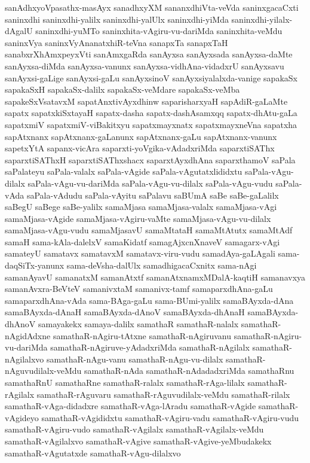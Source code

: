 {sanAdhxyoVpasathx-masAyx
sanadhxyXM
sananxdhiVta-veVda
saninxgacaCxti
saninxdhi
saninxdhi-yalilx
saninxdhi-yalUlx
saninxdhi-yiMda
saninxdhi-yilalx-dAgalU
saninxdhi-yuMTo
saninxhita-vAgiru-vu-dariMda
saninxhita-veMdu
saninxVya
saninxVyAnanatxhiR-teVna
sanapxTa
sanapxTaH
sanabxrXhAmxpeyxVti
sanAmxgaRda
sanAyxsa
sanAyxsada
sanAyxsa-daMte
sanAyxsa-diMda
sanAyxsa-vanunx
sanAyxsa-vidhAna-vidadxrU
sanAyxsavu
sanAyxsi-gaLige
sanAyxsi-gaLu
sanAyxsinoV
sanAyxsiyalalxda-vanige
sapakaSx
sapakaSxH
sapakaSx-dalilx
sapakaSx-veMdare
sapakaSx-veMba
sapakeSxVsatavxM
sapatAnxtivAyxdhinw
saparisharxyaH
sapAdiR-gaLaMte
sapatx
sapatxkiSxtayaH
sapatx-dasha
sapatx-dashAsamxqq
sapatx-dhAtu-gaLa
sapatxmiV
sapatxmiV-viBakitxyu
sapatxmayxnatx
sapatxmayxneVna
sapatxha
sapAtxnanx
sapAtxnanx-gaLanunx
sapAtxnanx-gaLu
sapAtxnanx-vanunx
sapetxYtA
sapanx-vicAra
saparxti-yoVgika-vAdadxriMda
saparxtiSAThx
saparxtiSAThxH
saparxtiSAThxshacx
saparxtAyxdhAna
saparxthamoV
saPala
saPalateyu
saPala-valalx
saPala-vAgide
saPala-vAgutatxlididxtu
saPala-vAgu-dilalx
saPala-vAgu-vu-dariMda
saPala-vAgu-vu-dilalx
saPala-vAgu-vudu
saPala-vAda
saPala-vAdudu
saPala-vAyitu
saPalavu
saBUmA
saBe
saBe-gaLalilx
saBegU
saBege
saBe-yalilx
samaMjasa
samaMjasa-valalx
samaMjasa-vAgi
samaMjasa-vAgide
samaMjasa-vAgiru-vaMte
samaMjasa-vAgu-vu-dilalx
samaMjasa-vAgu-vudu
samaMjasavU
samaMtataH
samaMtAtutx
samaMtAdf
samaH
sama-kAla-dalelxV
samaKidatf
samagAjxcnXnaveV
samagarx-vAgi
samateyU
samatavx
samatavxM
samatavx-viru-vudu
samadAya-gaLAgali
sama-daqSiTx-yanunx
sama-deVsha-dalUlx
samadhigacaCxnitx
sama-nAgi
samanAyavU
samanatxM
samanAtxtf
samanAtxnamxMDalA-kaqtiH
samanavxya
samanAvxra-BeVteV
samanivxtaM
samanivx-tamf
samaparxdhAna-gaLu
samaparxdhAna-vAda
sama-BAga-gaLu
sama-BUmi-yalilx
samaBAyxda-dAna
samaBAyxda-dAnaH
samaBAyxda-dAnoV
samaBAyxda-dhAnaH
samaBAyxda-dhAnoV
samayakekx
samaya-dalilx
samathaR
samathaR-nalalx
samathaR-nAgidAdxne
samathaR-nAgiru-tAtxne
samathaR-nAgiruvanu
samathaR-nAgiru-vu-dariMda
samathaR-nAgiruve-yAdadxriMda
samathaR-nAgilalx
samathaR-nAgilalxvo
samathaR-nAgu-vanu
samathaR-nAgu-vu-dilalx
samathaR-nAguvudilalx-veMdu
samathaR-nAda
samathaR-nAdadadxriMda
samathaRnu
samathaRnU
samathaRne
samathaR-ralalx
samathaR-rAga-lilalx
samathaR-rAgilalx
samathaR-rAguvaru
samathaR-rAguvudilalx-veMdu
samathaR-rilalx
samathaR-vAga-didadxre
samathaR-vAga-lAradu
samathaR-vAgide
samathaR-vAgideyo
samathaR-vAgididxtu
samathaR-vAgiru-vadu
samathaR-vAgiru-vudu
samathaR-vAgiru-vudo
samathaR-vAgilalx
samathaR-vAgilalx-veMdu
samathaR-vAgilalxvo
samathaR-vAgive
samathaR-vAgive-yeMbudakekx
samathaR-vAgutatxde
samathaR-vAgu-dilalxvo
}
